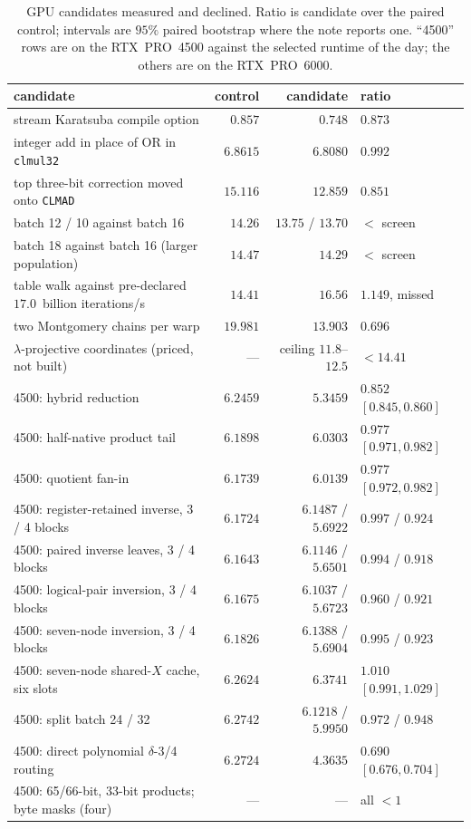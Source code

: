\begin{table}[t]
\centering
\small
\caption{GPU candidates measured and declined. Ratio is candidate
  over the paired control; intervals are $95\%$ paired bootstrap where
  the note reports one. ``4500'' rows are on the RTX~PRO~4500 against
  the selected runtime of the day; the others are on the RTX~PRO~6000.}
\label{tab:declined}
\begin{tabular}{@{}p{}rrl@{}}
\toprule
candidate & control & candidate & ratio \\
\midrule
stream Karatsuba compile option & $0.857$ & $0.748$ & $0.873$ \\
integer add in place of OR in \texttt{clmul32} & $6.8615$ & $6.8080$ & $0.992$ \\
top three-bit correction moved onto \texttt{CLMAD} & $15.116$ & $12.859$ & $0.851$ \\
batch 12 / 10 against batch 16 & $14.26$ & $13.75$ / $13.70$ & $<$ screen \\
batch 18 against batch 16 (larger population) & $14.47$ & $14.29$ & $<$ screen \\
table walk against pre-declared $17.0$~billion iterations/s & $14.41$ & $16.56$ & $1.149$, missed \\
two Montgomery chains per warp & $19.981$ & $13.903$ & $0.696$ \\
$\lambda$-projective coordinates (priced, not built) & --- & ceiling $11.8$--$12.5$ & $<14.41$ \\
4500: hybrid reduction & $6.2459$ & $5.3459$ & $0.852$ $[0.845, 0.860]$ \\
4500: half-native product tail & $6.1898$ & $6.0303$ & $0.977$ $[0.971, 0.982]$ \\
4500: quotient fan-in & $6.1739$ & $6.0139$ & $0.977$ $[0.972, 0.982]$ \\
4500: register-retained inverse, 3 / 4 blocks & $6.1724$ & $6.1487$ / $5.6922$ & $0.997$ / $0.924$ \\
4500: paired inverse leaves, 3 / 4 blocks & $6.1643$ & $6.1146$ / $5.6501$ & $0.994$ / $0.918$ \\
4500: logical-pair inversion, 3 / 4 blocks & $6.1675$ & $6.1037$ / $5.6723$ & $0.960$ / $0.921$ \\
4500: seven-node inversion, 3 / 4 blocks & $6.1826$ & $6.1388$ / $5.6904$ & $0.995$ / $0.923$ \\
4500: seven-node shared-$X$ cache, six slots & $6.2624$ & $6.3741$ & $1.010$ $[0.991, 1.029]$ \\
4500: split batch 24 / 32 & $6.2742$ & $6.1218$ / $5.9950$ & $0.972$ / $0.948$ \\
4500: direct polynomial $\delta$-3/4 routing & $6.2724$ & $4.3635$ & $0.690$ $[0.676, 0.704]$ \\
4500: 65/66-bit, 33-bit products; byte masks (four) & --- & --- & all $<1$ \\
\bottomrule
\end{tabular}
\end{table}

